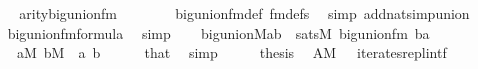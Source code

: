 \begin{isabellebody}
%
\isadelimproof
%
\endisadelimproof
%
\isatagproof
{}\isamarkupfalse%
\ {\isacharminus}{\kern0pt}\isanewline
\ \ \isamarkupfalse%
\ {}{\isacharcolon}{\kern0pt}{\isachardoublequoteopen}arity{\isacharparenleft}{\kern0pt}big{\isacharunderscore}{\kern0pt}union{\isacharunderscore}{\kern0pt}fm{\isacharparenleft}{\kern0pt}{}{\isacharcomma}{\kern0pt}{}{\isacharparenright}{\kern0pt}{\isacharparenright}{\kern0pt}\ {\isacharequal}{\kern0pt}\ {}{\isachardoublequoteclose}\isanewline
\ \ \ \ \isamarkupfalse%
\ big{\isacharunderscore}{\kern0pt}union{\isacharunderscore}{\kern0pt}fm{\isacharunderscore}{\kern0pt}def\ fm{\isacharunderscore}{\kern0pt}defs\ \isamarkupfalse%
\ {\isacharparenleft}{\kern0pt}simp\ add{\isacharcolon}{\kern0pt}nat{\isacharunderscore}{\kern0pt}simp{\isacharunderscore}{\kern0pt}union{\isacharparenright}{\kern0pt}\isanewline
\ \ \isamarkupfalse%
\ {}{\isacharcolon}{\kern0pt}{\isachardoublequoteopen}big{\isacharunderscore}{\kern0pt}union{\isacharunderscore}{\kern0pt}fm{\isacharparenleft}{\kern0pt}{}{\isacharcomma}{\kern0pt}{}{\isacharparenright}{\kern0pt}{\isasymin}formula{\isachardoublequoteclose}\ \isamarkupfalse%
\ simp\isanewline
\ \ \isamarkupfalse%
\ {\isachardoublequoteopen}big{\isacharunderscore}{\kern0pt}union{\isacharparenleft}{\kern0pt}{\isacharhash}{\kern0pt}{\isacharhash}{\kern0pt}M{\isacharcomma}{\kern0pt}a{\isacharcomma}{\kern0pt}b{\isacharparenright}{\kern0pt}\ {\isasymlongleftrightarrow}\ sats{\isacharparenleft}{\kern0pt}M{\isacharcomma}{\kern0pt}\ big{\isacharunderscore}{\kern0pt}union{\isacharunderscore}{\kern0pt}fm{\isacharparenleft}{\kern0pt}{}{\isacharcomma}{\kern0pt}{}{\isacharparenright}{\kern0pt}{\isacharcomma}{\kern0pt}\ {\isacharbrackleft}{\kern0pt}b{\isacharcomma}{\kern0pt}a{\isacharbrackright}{\kern0pt}{\isacharparenright}{\kern0pt}{\isachardoublequoteclose}\isanewline
\ \ \ \ \ {\isachardoublequoteopen}a{\isasymin}M{\isachardoublequoteclose}\ {\isachardoublequoteopen}b{\isasymin}M{\isachardoublequoteclose}\ \ a\ b\isanewline
\ \ \ \ \isamarkupfalse%
\ that\ \isamarkupfalse%
\ simp\isanewline
\ \ \isamarkupfalse%
\ \isamarkupfalse%
\ {\isacharquery}{\kern0pt}thesis\ \isamarkupfalse%
\ {\isacartoucheopen}A{\isasymin}M{\isacartoucheclose}\ {}\ {}\ iterates{\isacharunderscore}{\kern0pt}repl{\isacharunderscore}{\kern0pt}intf\ \isamarkupfalse%

\end{isabellebody}
